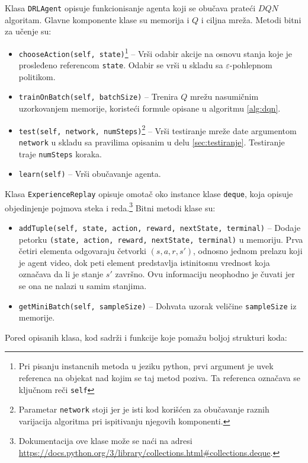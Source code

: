 Klasa \texttt{DRLAgent} opisuje funkcionisanje agenta koji se obučava prateći $DQN$ algoritam. Glavne komponente klase su memorija i $Q$ i ciljna mreža. Metodi bitni za učenje su:
\begin{itemize}
	\item \texttt{chooseAction(self, state)}\footnote{Pri pisanju instancnih metoda u jeziku python, prvi argument je uvek referenca na objekat nad kojim se taj metod poziva. Ta referenca označava se ključnom reči \texttt{self}} -- Vrši odabir akcije na osnovu stanja koje je prosleđeno referencom \texttt{state}. Odabir se vrši u skladu sa $\varepsilon$-pohlepnom politikom.
	\item \texttt{trainOnBatch(self, batchSize)} -- Trenira $Q$ mrežu nasumičnim uzorkovanjem memorije, koristeći formule opisane u algoritmu \ref{alg:dqn}.
	\item \texttt{test(self, network, numSteps)}\footnote{Parametar \texttt{network} stoji jer je isti kod korišćen za obučavanje raznih varijacija algoritma pri ispitivanju njegovih komponenti.} -- Vrši testiranje mreže date argumentom \texttt{network} u skladu sa pravilima opisanim u delu \ref{sec:testiranje}. Testiranje traje \texttt{numSteps} koraka.
	\item \texttt{learn(self)} -- Vrši obučavanje agenta. 
\end{itemize}
\par 
Klasa \texttt{ExperienceReplay} opisuje omotač oko instance klase \texttt{deque}, koja opisuje objedinjenje pojmova steka i reda.\footnote{Dokumentacija ove klase može se naći na adresi \url{https://docs.python.org/3/library/collections.html\#collections.deque}.} Bitni metodi klase su:
\begin{itemize}
	\item \texttt{addTuple(self, state, action, reward, nextState, terminal)} -- Dodaje petorku \texttt{(state, action, reward, nextState, terminal)} u memoriju. Prva četiri elementa odgovaraju četvorki $(s, a, r, s')$, odnosno jednom prelazu koji je agent video, dok peti element predstavlja istinitosnu vrednost koja označava da li je stanje $s'$ završno. Ovu informaciju neophodno je čuvati jer se ona ne nalazi u samim stanjima.
	\item \texttt{getMiniBatch(self, sampleSize)} -- Dohvata uzorak veličine \texttt{sampleSize} iz memorije.
\end{itemize}
\par 
Pored opisanih klasa, kod sadrži i funkcije koje pomažu boljoj strukturi koda:
